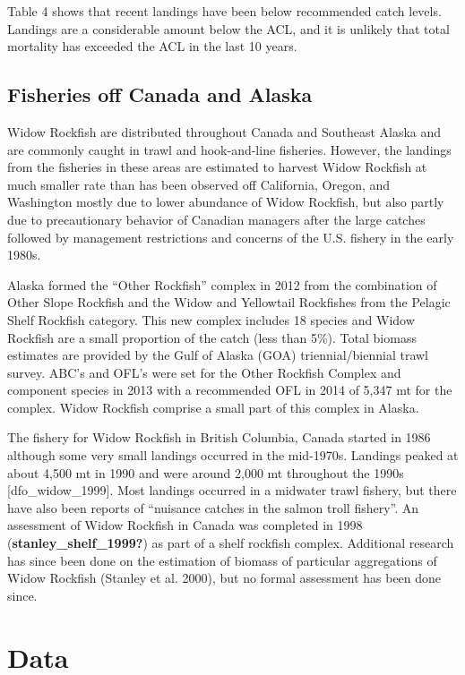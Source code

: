 \documentclass[
]{scrartcl}
\begin{document}
Table 4 shows that recent landings have been below recommended catch
levels. Landings are a considerable amount below the ACL, and it is
unlikely that total mortality has exceeded the ACL in the last 10 years.

\subsection{Fisheries off Canada and
Alaska}\label{fisheries-off-canada-and-alaska}

Widow Rockfish are distributed throughout Canada and Southeast Alaska
and are commonly caught in trawl and hook-and-line fisheries. However,
the landings from the fisheries in these areas are estimated to harvest
Widow Rockfish at much smaller rate than has been observed off
California, Oregon, and Washington mostly due to lower abundance of
Widow Rockfish, but also partly due to precautionary behavior of
Canadian managers after the large catches followed by management
restrictions and concerns of the U.S. fishery in the early 1980s.

Alaska formed the ``Other Rockfish'' complex in 2012 from the
combination of Other Slope Rockfish and the Widow and Yellowtail
Rockfishes from the Pelagic Shelf Rockfish category. This new complex
includes 18 species and Widow Rockfish are a small proportion of the
catch (less than 5\%). Total biomass estimates are provided by the Gulf
of Alaska (GOA) triennial/biennial trawl survey. ABC's and OFL's were
set for the Other Rockfish Complex and component species in 2013 with a
recommended OFL in 2014 of 5,347 mt for the complex. Widow Rockfish
comprise a small part of this complex in Alaska.

The fishery for Widow Rockfish in British Columbia, Canada started in
1986 although some very small landings occurred in the mid-1970s.
Landings peaked at about 4,500 mt in 1990 and were around 2,000 mt
throughout the 1990s {[}dfo\_widow\_1999{]}. Most landings occurred in a
midwater trawl fishery, but there have also been reports of ``nuisance
catches in the salmon troll fishery''. An assessment of Widow Rockfish
in Canada was completed in 1998 (\textbf{stanley\_shelf\_1999?}) as part
of a shelf rockfish complex. Additional research has since been done on
the estimation of biomass of particular aggregations of Widow Rockfish
(Stanley et al. 2000), but no formal assessment has been done since.

\newpage{}

\section{Data}\label{data}
\end{document}
